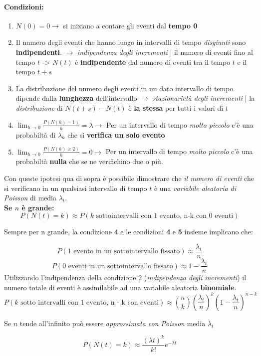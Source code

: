 \documentclass[]{article}
\begin{document}
    \paragraph{Condizioni:}
    \begin{enumerate}
        \item $N(0) = 0 \longrightarrow$ si iniziano a contare gli eventi dal \textbf{tempo 0}
        \item Il numero degli eventi che hanno luogo in intervalli di tempo \textit{disgiunti} sono \textbf{indipendenti}. $\rightarrow$ \textit{indipendenza degli incrementi} | 
        il numero di eventi fino al tempo $t$ -> $N(t)$ è \textbf{indipendente} dal numero di eventi tra il tempo $t$ e il tempo $t+s$
        \item La distribuzione del numero degli eventi in un dato intervallo di tempo dipende dalla \textbf{lunghezza} dell'intervallo $\rightarrow$ \textit{stazionarietà degli incrementi} | la \textit{distribuzione} di $N(t+s) - N(t)$ è \textbf{la stessa} per tutti i valori di $t$
        \item $\displaystyle \lim_{h \to 0} \frac{P(N(h) = 1)}{h} = \lambda \rightarrow$ Per un intervallo di tempo \textit{molto piccolo} c'è una probabiltà di $\lambda_h$ che si \textbf{verifica un solo evento}
        \item $\displaystyle \lim_{h \to 0} \frac{P(N(h) \geq 2)}{h} = 0 \rightarrow$ Per un intervallo di tempo \textit{molto piccolo} c'è una probabiltà \textbf{nulla} che se ne verifichino due o più.
    \end{enumerate}
    Con queste ipotesi qua di sopra è possibile dimostrare che \textit{il numero di eventi} che si verificano in un qualsiasi intervallo di tempo $t$ è una \textit{variabile aleatoria di Poisson} di media $\lambda_t$. \\
    \textbf{Se $n$ è grande:}
    \[ P(N(t) = k) \approx P(k \text{ sottointervalli con 1 evento, n-k con 0 eventi}) \]
    \centerline{Sempre per n grande, la condizione \textbf{4} e le condizioni \textbf{4} e \textbf{5} insieme implicano che:}
    \[ P(1 \text{ evento in un sottointervallo fissato}) \approx \frac{\lambda_t}{n} \]
    \[ P(0 \text{ eventi in un sottointervallo fissato}) \approx 1 - \frac{\lambda_t}{n} \]
    Utilizzando l'indipendenza della condizione 2 (\textit{indipendenza degli incrementi}) il numero totale di eventi
    è assimilabile ad una variabile aleatoria \textbf{binomiale}.
    \[ P(k \text{ sotto intervalli con 1 evento, n - k con eventi}) \approx \binom{n}{k} (\frac{\lambda_t}{n})^k (1 - \frac{\lambda_t}{n})^{n-k}  \] 
    \centerline{Se $n$ tende all'infinito può essere \textit{approssimata con Poisson} media $\lambda_t$}
    \[ P(N(t) = k) \approx \frac{(\lambda t)^k}{k!} e^{-\lambda t}\]
\end{document}
